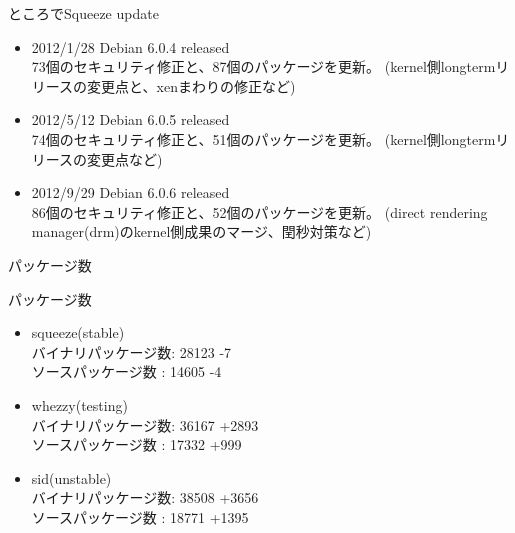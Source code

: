 \begin{frame}{ところでSqueeze update}

\begin{itemize}[<+->]
\item 2012/1/28 Debian 6.0.4 released \\
73個のセキュリティ修正と、87個のパッケージを更新。
(kernel側longtermリリースの変更点と、xenまわりの修正など)
\item 2012/5/12 Debian 6.0.5 released \\
74個のセキュリティ修正と、51個のパッケージを更新。
(kernel側longtermリリースの変更点など)
\item 2012/9/29 Debian 6.0.6 released \\
86個のセキュリティ修正と、52個のパッケージを更新。
(direct rendering manager(drm)のkernel側成果のマージ、閏秒対策など)
\end{itemize}

\end{frame}

\begin{frame}
\begin{center}
\LARGE{パッケージ数}
\end{center}
\end{frame}

\begin{frame}{パッケージ数}
\begin{itemize}[<+->]

\item squeeze(stable)\\
バイナリパッケージ数: 28123 {\color{blue}-7}\\
ソースパッケージ数  : 14605 {\color{blue}-4}

\item whezzy(testing)\\ 
バイナリパッケージ数: 36167 {\color{red}+2893}\\
ソースパッケージ数  : 17332 {\color{red}+999}

\item sid(unstable)\\ 
バイナリパッケージ数: 38508 {\color{red}+3656}\\
ソースパッケージ数  : 18771 {\color{red}+1395}
\end{itemize}
\end{frame}

